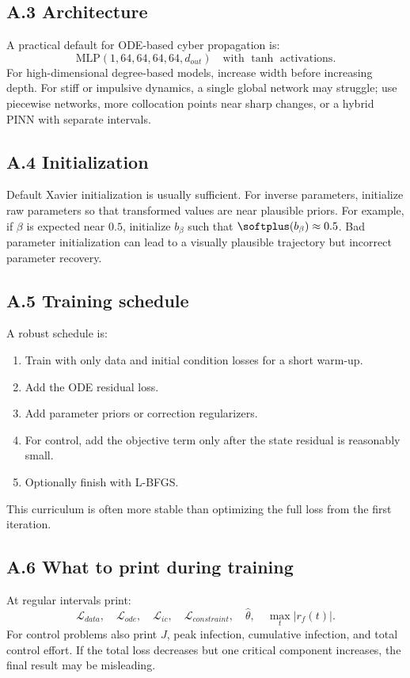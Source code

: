 \documentclass[11pt,a4paper]{article}
\begin{document}
\subsection*{A.3 Architecture}
A practical default for ODE-based cyber propagation is:
\begin{equation}
    \text{MLP}(1,64,64,64,64,d_{out}) \quad \text{with } \tanh \text{ activations}.
\end{equation}
For high-dimensional degree-based models, increase width before increasing depth. For stiff or impulsive dynamics, a single global network may struggle; use piecewise networks, more collocation points near sharp changes, or a hybrid PINN with separate intervals.

\subsection*{A.4 Initialization}
Default Xavier initialization is usually sufficient. For inverse parameters, initialize raw parameters so that transformed values are near plausible priors. For example, if $\beta$ is expected near $0.5$, initialize $b_\beta$ such that $\softplus(b_\beta)\approx 0.5$. Bad parameter initialization can lead to a visually plausible trajectory but incorrect parameter recovery.

\subsection*{A.5 Training schedule}
A robust schedule is:
\begin{enumerate}[leftmargin=2em]
    \item Train with only data and initial condition losses for a short warm-up.
    \item Add the ODE residual loss.
    \item Add parameter priors or correction regularizers.
    \item For control, add the objective term only after the state residual is reasonably small.
    \item Optionally finish with L-BFGS.
\end{enumerate}
This curriculum is often more stable than optimizing the full loss from the first iteration.

\subsection*{A.6 What to print during training}
At regular intervals print:
\begin{equation}
    \mathcal{L}_{data},\quad \mathcal{L}_{ode},\quad \mathcal{L}_{ic},\quad \mathcal{L}_{constraint},\quad \hat{\theta},\quad \max_t |r_f(t)|.
\end{equation}
For control problems also print $J$, peak infection, cumulative infection, and total control effort. If the total loss decreases but one critical component increases, the final result may be misleading.
\end{document}
